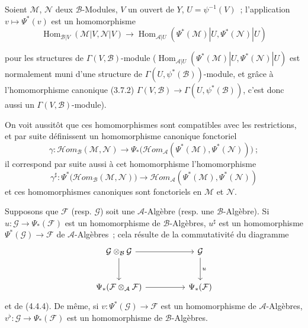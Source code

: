 \begin{env}[4.4.6]
\label{0.4.4.6-fr}
Soient $\mathcal{M}$, $\mathcal{N}$ deux $\mathcal{B}$-Modules, $V$ un ouvert
de $Y$, $U=\psi^{-1}(V)$~; l'application $v\mapsto\Psi^*(v)$ est un
homomorphisme
\[
  \operatorname{Hom}_{\mathcal{B}|V}(\mathcal{M}|V,\mathcal{N}|V)
  \longrightarrow
  \operatorname{Hom}_{\mathcal{A}|U}
  (\Psi^*(\mathcal{M})|U,\Psi^*(\mathcal{N})|U)
\]
\begin{sloppypar}
pour les structures de $\Gamma(V,\mathcal{B})$-module
($\operatorname{Hom}_{\mathcal{A}|U}
(\Psi^*(\mathcal{M})|U,\allowbreak\Psi^*(\mathcal{N})|U)$ est normalement muni d'une
structure de $\Gamma(U,\psi^*(\mathcal{B}))$-module, et grâce à
l'homomorphisme
canonique (3.7.2)
$\Gamma(V,\mathcal{B})\to\Gamma(U,\psi^*(\mathcal{B}))$, c'est donc aussi un
$\Gamma(V,\mathcal{B})$-module).
\end{sloppypar}
On voit aussitôt que ces homomorphismes sont
compatibles avec les restrictions, et par suite définissent un homomorphisme
canonique fonctoriel
\[
  \gamma:\mathcal{H}\!om_{\mathcal{B}}(\mathcal{M},\mathcal{N})
  \longrightarrow
  \Psi_*\bigl(\mathcal{H}\!om_{\mathcal{A}}
  (\Psi^*(\mathcal{M}),\Psi^*(\mathcal{N}))\bigr)~;
\]
il correspond par suite aussi à cet homomorphisme l'homomorphisme
\[
  \gamma^\sharp:
  \Psi^*\bigl(\mathcal{H}\!om_{\mathcal{B}}(\mathcal{M},\mathcal{N})\bigr)
  \longrightarrow
  \mathcal{H}\!om_{\mathcal{A}}
  (\Psi^*(\mathcal{M}),\Psi^*(\mathcal{N}))
\]
et ces homomorphismes canoniques sont fonctoriels en $\mathcal{M}$ et
$\mathcal{N}$.
\end{env}

\begin{env}[4.4.7]
\label{0.4.4.7-fr}
Supposons que $\mathcal{F}$ (resp. $\mathcal{G}$) soit une
$\mathcal{A}$-Algèbre (resp. une $\mathcal{B}$-Algèbre). Si
$u:\mathcal{G}\to\Psi_*(\mathcal{F})$ est un homomorphisme de
$\mathcal{B}$-Algèbres, $u^\sharp$ est un homomorphisme
$\Psi^*(\mathcal{G})\to\mathcal{F}$ de $\mathcal{A}$-Algèbres~; cela résulte
de la commutativité du diagramme
\[
\begin{tikzcd}[column sep=huge,row sep=large]
\mathcal{G}\otimes_{\mathcal{B}}\mathcal{G}
  \arrow[r] \arrow[d]
  & \mathcal{G} \arrow[d,"u"] \\
\Psi_*(\mathcal{F}\otimes_{\mathcal{A}}\mathcal{F})
  \arrow[r]
  & \Psi_*(\mathcal{F})
\end{tikzcd}
\]
et de (4.4.4). De même, si $v:\Psi^*(\mathcal{G})\to\mathcal{F}$ est un
homomorphisme de $\mathcal{A}$-Algèbres,
$v^\flat:\mathcal{G}\to\Psi_*(\mathcal{F})$ est un homomorphisme de
$\mathcal{B}$-Algèbres.
\end{env}

